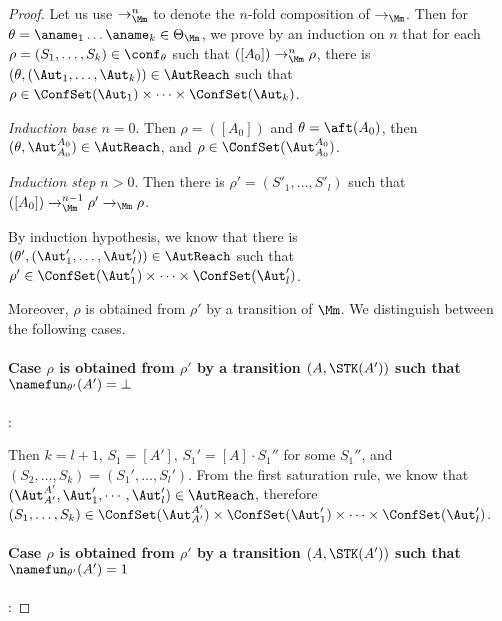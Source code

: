 \begin{proof}
Let us use $\rightarrow_{\Mm}^n$ to denote the $n$-fold composition of $\rightarrow_\Mm$. Then for $\theta = \aname_1 \dots \aname_k \in \Theta_\Mm$, we prove by an induction on $n$ that for each $\rho = (S_1, \dots, S_k) \in \conf_\theta$ such that  $([A_0]) \rightarrow^n_\Mm \rho$, there is  $(\theta, (\Aut_1, \dots, \Aut_k)) \in \AutReach$ such that $\rho \in  \ConfSet(\Aut_1) \times \dots \times \ConfSet(\Aut_k)$.

\noindent \emph{Induction base $n = 0$}. Then $\rho = ([A_0])$ and $\theta = \aft(A_0)$, then $(\theta, \Aut_{A_0}^{A_0}) \in \AutReach$, and $\rho \in \ConfSet(\Aut_{A_0}^{A_0})$.

\smallskip

\noindent \emph{Induction step $n > 0$}. Then there is $\rho' = (S'_1, \dots, S'_l)$ such that $([A_0]) \rightarrow^{n-1}_\Mm \rho' \rightarrow_\Mm \rho$.

By induction hypothesis, we know that there is $(\theta', (\Aut'_1, \dots, \Aut'_l)) \in \AutReach$ such that $ \rho' \in \ConfSet(\Aut'_1) \times \dots \times \ConfSet(\Aut'_l)$.

Moreover, $\rho$ is obtained from $\rho'$  by a transition of $\Mm$. We distinguish between the following cases.

\smallskip
\paragraph{Case $\rho$ is obtained from $\rho'$ by a transition $(A,\STK(A'))$ such that $\namefun_{\theta'}(A')=\bot$}: 

Then $k=l+1$, $S_1=[A']$, $S_1'=[A]\cdot S_1''$ for some $S_1''$, and $(S_2,\dots,S_k)=(S_1',\dots,S_l')$.
From the first saturation rule, we know that $(\Aut_{A'}^{A'},\Aut_1',\cdots,\Aut_l')\in\AutReach$, 
therefore $(S_1,\dots,S_k)\in\ConfSet(\Aut_{A'}^{A'})\times\ConfSet(\Aut_1')\times\cdots\times\ConfSet(\Aut_l')$.
\paragraph{Case $\rho$ is obtained from $\rho'$ by a transition $(A,\STK(A'))$ such that $\namefun_{\theta'}(A')=1$}: 


\end{proof}
